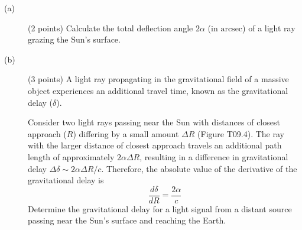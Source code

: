 \begin{description}
\item[(a)] (2 points) Calculate the total deflection angle $2\alpha$ (in
  $\mathrm{arcsec}$) of a light ray grazing the Sun's surface.
\item[(b)] (3 points) A light ray propagating in the gravitational field of a
  massive object experiences an additional travel time, known as the
  gravitational delay ($\delta$).


  Consider two light rays passing near the Sun with distances of closest
  approach ($R$) differing by a small amount $\Delta R$ (Figure T09.4). The ray
  with the larger distance of closest approach travels an additional path
  length of approximately $2\alpha\Delta R$, resulting in a difference in
  gravitational delay $\Delta\delta \sim 2\alpha\Delta R/c$. Therefore, the
  absolute value of the derivative of the gravitational delay is
  \[ \frac{d\delta}{dR} = \frac{2\alpha}{c} \]
  Determine the gravitational delay for a light signal from a distant source
  passing near the Sun's surface and reaching the Earth.
\end{description}
